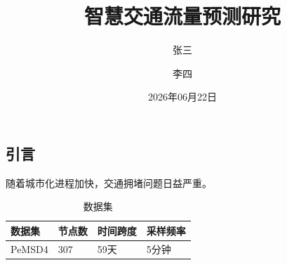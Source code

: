 \documentclass[twocolumn,dark,nomath]{harryopo-paper}
\title{智慧交通流量预测研究}
\author{张三 \and 李四}
\date{2026年06月22日}
\begin{document}
\maketitlewithabstract
\subsection{引言}
随着城市化进程加快，交通拥堵问题日益严重。
\begin{table}[htbp]
  \centering
  \caption{数据集}
  \begin{tabular}{llll}
    \toprule
    数据集 & 节点数 & 时间跨度 & 采样频率 \\
    \midrule
    PeMSD4 & 307 & 59天 & 5分钟 \\
    \bottomrule
  \end{tabular}
\end{table}
\end{document}
